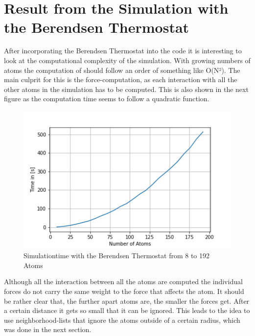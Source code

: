 \section{Result from the Simulation with the Berendsen Thermostat}

After incorporating the Berendsen Thermostat into the code it is interesting to look at the computational complexity of the simulation. With growing numbers of atoms the computation of should follow an order of something like O(N²). The main culprit for this is the force-computation, as each interaction with all the other atoms in the simulation has to be computed. This is also shown in the next figure as the computation time seems to follow a quadratic function. 
\begin{figure}
	\begin{center}
		\includegraphics[scale=1]{Figure/plotAtomTimes.png}
	\end{center}
	\caption[Simulationtime with the Berendsen Thermostat from 8 to 192 Atoms]{Simulationtime with the Berendsen Thermostat from 8 to 192 Atoms }
	\label{PlotSimulationTimeBerendsenThermostat}
\end{figure}
Although all the interaction between all the atoms are computed the individual forces do not carry the same weight to the force that affects the atom. It should be rather clear that, the further apart atoms are, the smaller the forces get. After a certain distance it gets so small that it can be ignored. This leads to the idea to use neighborhood-lists that ignore the atoms outside of a certain radius, which was done in the next section.

